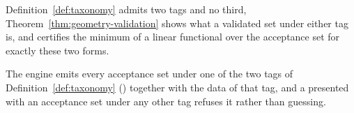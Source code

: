 
Definition~\ref{def:taxonomy} admits two tags and no third,
Theorem~\ref{thm:geometry-validation} shows what a validated set under either tag is, and
 certifies the minimum of a linear
functional over the acceptance set for exactly these two forms.

\begin{requirement}\label{req:geometry-tag}
The engine emits every acceptance set under one of the two tags of
Definition~\ref{def:taxonomy} () together with the data of
that tag, and a  presented with an acceptance set under any
other tag refuses it rather than guessing.
\end{requirement}
